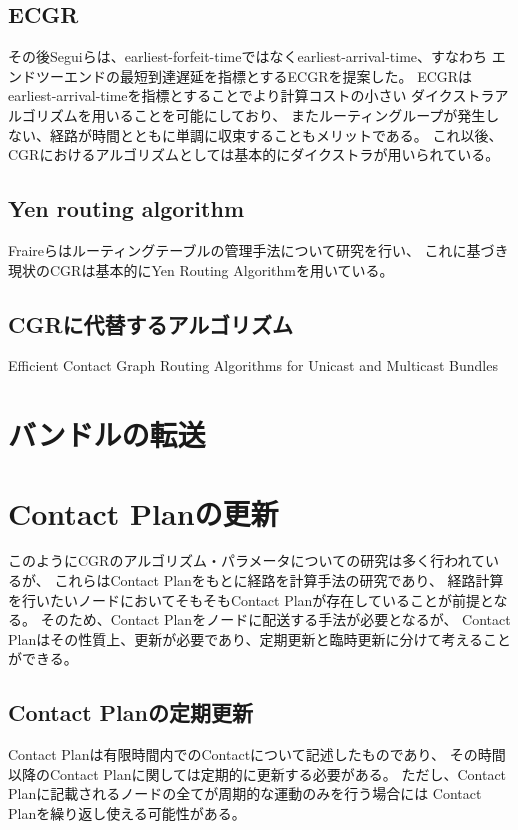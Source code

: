 \subsection{ECGR}
その後Seguiらは、earliest-forfeit-timeではなくearliest-arrival-time、すなわち
エンドツーエンドの最短到達遅延を指標とするECGRを提案した\cite{6134460}。
ECGRはearliest-arrival-timeを指標とすることでより計算コストの小さい
ダイクストラアルゴリズムを用いることを可能にしており、
またルーティングループが発生しない、経路が時間とともに単調に収束することもメリットである。
これ以後、CGRにおけるアルゴリズムとしては基本的にダイクストラが用いられている。


\subsection{Yen routing algorithm}
\label{subsection:Yen routing algorithm}
Fraireらはルーティングテーブルの管理手法について研究を行い、
これに基づき現状のCGRは基本的にYen Routing Algorithmを用いている。\cite{FRAIRE2018}

\subsection{CGRに代替するアルゴリズム}
\label{subsection:CGRに代替するアルゴリズムの研究}
Efficient Contact Graph Routing Algorithms for Unicast and Multicast Bundles
\cite{DeJonckere2019}

\section{バンドルの転送}
\label{section:バンドルの転送}


\section{Contact Planの更新}
\label{sec:ContactPlanの更新}
このようにCGRのアルゴリズム・パラメータについての研究は多く行われているが、
これらはContact Planをもとに経路を計算手法の研究であり、
経路計算を行いたいノードにおいてそもそもContact Planが存在していることが前提となる。
そのため、Contact Planをノードに配送する手法が必要となるが、
Contact Planはその性質上、更新が必要であり、定期更新と臨時更新に分けて考えることができる。

\subsection{Contact Planの定期更新}
\label{sec:ContactPlanの定期更新}
Contact Planは有限時間内でのContactについて記述したものであり、
その時間以降のContact Planに関しては定期的に更新する必要がある。
ただし、Contact Planに記載されるノードの全てが周期的な運動のみを行う場合には
Contact Planを繰り返し使える可能性がある。

